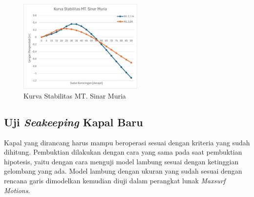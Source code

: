 \begin{figure}[!ht]
    \centering
    \includegraphics[width=0.55\textwidth]{grafik/kurva-stabilitas-new.jpg}
    \caption{Kurva Stabilitas MT. Sinar Muria}
    \label{fig:kurva-stabilitas-new}
\end{figure}

\subsection{Uji \emph{Seakeeping} Kapal Baru}
\label{subsec:uji-seakeeping-new-gg}

Kapal yang dirancang harus mampu beroperasi sesuai dengan kriteria yang sudah dihitung. Pembuktian dilakukan dengan cara yang sama pada saat pembuktian hipotesis, yaitu dengan cara menguji model lambung sesuai dengan ketinggian gelombang yang ada. Model lambung dengan ukuran yang sudah sesuai dengan rencana garis dimodelkan kemudian diuji dalam perangkat lunak \emph{Maxsurf Motions}. 

